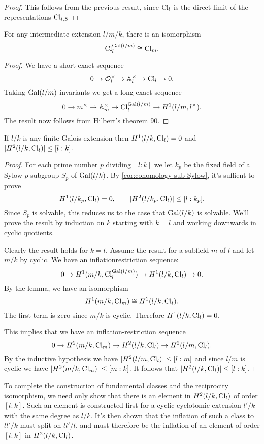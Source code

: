 \begin{proof}
	This follows from the previous result, since $\mathrm{Cl}_l$ is the direct limit of
	the representations $\mathrm{Cl}_{l,S}$
\end{proof}


\begin{lemma}
	For any intermediate extension $l/m/k$, there is an isomorphism
	\[
		\mathrm{Cl}_{l}^{\mathrm{Gal}(l/m)} \cong \mathrm{Cl}_{m}.
	\]
\end{lemma}

\begin{proof}
	We have a short exact sequence
	\[
		0 \to {\mathcal O}_{l}^\times \to {\mathbb A}_{l}^\times \to \mathrm{Cl}_{l} \to 0.
	\]
	Taking $\mathrm{Gal}(l/m)$-invariants we get a long exact sequence
	\[
		0 \to m^\times \to {\mathbb A}_{m}^\times \to \mathrm{Cl}_{l}^{\mathrm{Gal}(l/m)} \to
		H^1(l/m,l^\times).
	\]
	The result now follows from Hilbert's theorem 90.
\end{proof}

\begin{theorem}
	If $l/k$ is any finite Galois extension then $H^1(l/k, \mathrm{Cl}_{l}) = 0$
	and $|H^2(l/k, \mathrm{Cl}_{l})| \le [l:k]$.
\end{theorem}


\begin{proof}
	For each prime number $p$ dividing $[l:k]$ we let $k_p$ be the fixed
	field of a Sylow $p$-subgroup $S_p$ of $\mathrm{Gal}(l/k)$.
	By \ref{cor:cohomology sub Sylow}, it's suffient to prove
	\[
		H^1(l/k_p, \mathrm{Cl}_{l}) = 0, \qquad
		|H^2(l/k_p, \mathrm{Cl}_{l})| \le [l:k_p].
	\]
	Since $S_p$ is solvable, this reduces us to the case that $\mathrm{Gal}(l/k)$ is solvable.
	We'll prove the result by induction on $k$ starting with $k=l$ and working downwards
	in cyclic quotients.

	Clearly the result holds for $k=l$.
	Assume the result for a subfield $m$ of $l$ and let $m/k$ by cyclic.
	We have an inflationrestriction sequence:
	\[
		0 \to H^1(m/k, \mathrm{Cl}_{l}^{\mathrm{Gal}(l/m)}) \to H^1(l/k, \mathrm{Cl}_{l}) \to 0.
	\]
	By the lemma, we have an isomorphism
	\[
		H^1(m/k, \mathrm{Cl}_{m}) \cong H^1(l/k, \mathrm{Cl}_{l}) .
	\]
	The first term is zero since $m/k$ is cyclic.
	Therefore $H^1(l/k,\mathrm{Cl}_l)=0$.

	This implies that we have an inflation-restriction sequence
	\[
		0 \to H^2(m/k, \mathrm{Cl}_m) \to H^2(l/k, \mathrm{Cl}_l) \to H^2(l/m,\mathrm{Cl}_l).
	\]
	By the inductive hypothesis we have $|H^2(l/m,\mathrm{Cl}_l)| \le [l:m]$
	and since $l/m$ is cyclic we have $|H^2(m/k, \mathrm{Cl}_m)| \le [m : k]$.
	It follows that $|H^2(l/k,\mathrm{Cl}_l)| \le [l : k]$.
\end{proof}


To complete the construction of fundamental classes and the reciprocity isomorphism,
we need only show that there is an element in $H^2(l/k,\mathrm{Cl}_l)$ of order $[l:k]$.
Such an element is constructed first for a cyclic cyclotomic extension $l'/k$ with the same degree
as $l/k$.
It's then shown that the inflation of such a class to $ll'/k$ must split on $ll'/l$,
and must therefore be the inflation of an element of order $[l:k]$ in $H^2(l/k,\mathrm{Cl}_l)$.
